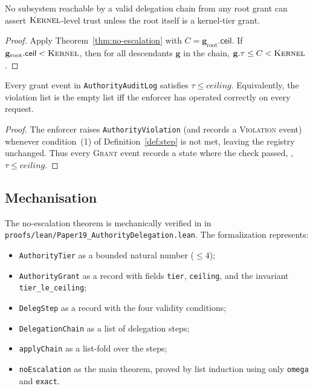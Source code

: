 \documentclass[11pt]{article}
\newcommand{\AGrant}{\mathbf{g}}            %
\newcommand{\ACeil}{\mathsf{ceil}}          %
\newcommand{\ARoot}{\mathbf{g}_{\mathrm{root}}} %
\newcommand{\TierKERNEL}{\textsc{Kernel}}
\begin{document}
\begin{corollary}\label{cor:kernel}
No subsystem reachable by a valid delegation chain from any root grant
can assert $\TierKERNEL$-level trust unless the root itself is a
kernel-tier grant.
\end{corollary}
\begin{proof}
Apply Theorem~\ref{thm:no-escalation} with $C = \ARoot.\ACeil$.
If $\ARoot.\ACeil < \TierKERNEL$, then for all descendants
$\AGrant$ in the chain, $\AGrant.\tau \leq C < \TierKERNEL$.
\end{proof}

\begin{corollary}\label{cor:audit}
Every grant event in \texttt{AuthorityAuditLog} satisfies
$\tau \leq \textit{ceiling}$.  Equivalently, the violation list is
the empty list iff the enforcer has operated correctly on every request.
\end{corollary}
\begin{proof}
The enforcer raises \texttt{AuthorityViolation} (and records a
\textsc{Violation} event) whenever condition~(1) of
Definition~\ref{def:step} is not met, leaving the registry unchanged.
Thus every \textsc{Grant} event records a state where the check
passed, \ie, $\tau \leq \textit{ceiling}$.
\end{proof}

\subsection{\LEAN{} Mechanisation}\label{sec:lean}

The no-escalation theorem is mechanically verified in \LEAN{} in
\texttt{proofs/lean/Paper19\_AuthorityDelegation.lean}.  The
formalization represents:
\begin{itemize}[leftmargin=1.5em,itemsep=2pt]
  \item \texttt{AuthorityTier} as a bounded natural number ($\leq 4$);
  \item \texttt{AuthorityGrant} as a record with fields
        \texttt{tier}, \texttt{ceiling}, and the invariant
        \texttt{tier\_le\_ceiling};
  \item \texttt{DelegStep} as a record with the four validity conditions;
  \item \texttt{DelegationChain} as a list of delegation steps;
  \item \texttt{applyChain} as a list-fold over the steps;
  \item \texttt{noEscalation} as the main theorem, proved by list
        induction using only \texttt{omega} and \texttt{exact}.
\end{itemize}
\end{document}
